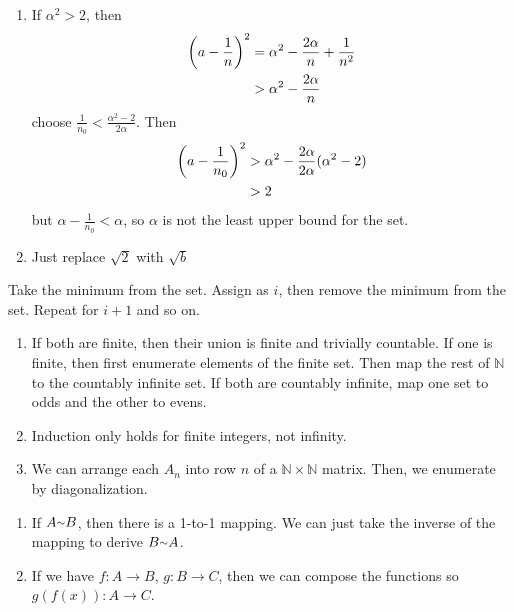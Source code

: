 \begin{exercise}
\begin{enumerate}[label=(\alph*)]
	\item If $\alpha^2 > 2$, then 
	\begin{align*}
		\left(a - \frac{1}{n}\right)^2 &= \alpha^2 - \frac{2\alpha}{n} + \frac{1}{n^2} \\
		&> \alpha^2 - \frac{2\alpha}{n}
	\end{align*}
	choose $\frac{1}{n_0} < \frac{\alpha^2 - 2}{2\alpha}$. Then
	\begin{align*}
		\left(a - \frac{1}{n_0}\right)^2 &> \alpha^2 - \frac{2\alpha}{2\alpha}(\alpha^2 - 2)\\
		&> 2
	\end{align*}
	but $\alpha - \frac{1}{n_0} < \alpha$, so $\alpha$ is not the least upper bound for the set.
	\item Just replace $\sqrt{2}$ with $\sqrt{b}$
\end{enumerate}
\end{exercise}

\begin{exercise}
	Take the minimum from the set. Assign as $i$, then remove the minimum from the set. Repeat for $i+1$ and so on.
\end{exercise}

\begin{exercise}
\begin{enumerate}[label=(\alph*)]
	\item If both are finite, then their union is finite and trivially countable. If one is finite, then first enumerate elements of the finite set. Then map the rest of $\mathbb{N}$ to the countably infinite set. If both are countably infinite, map one set to odds and the other to evens.
	\item Induction only holds for finite integers, not infinity.
	\item We can arrange each $A_n$ into row $n$ of a $\mathbb{N}\times \mathbb{N}$ matrix. Then, we enumerate by diagonalization.
\end{enumerate}
\end{exercise}

\begin{exercise}
\begin{enumerate}[label=(\alph*)]
	\item If $A \tat B$, then there is a 1-to-1 mapping. We can just take the inverse of the mapping to derive $B \tat A$.
	\item If we have $f: A \rightarrow B$, $g: B \rightarrow C$, then we can compose the functions so $g(f(x)): A \rightarrow C$.
\end{enumerate}
\end{exercise}

